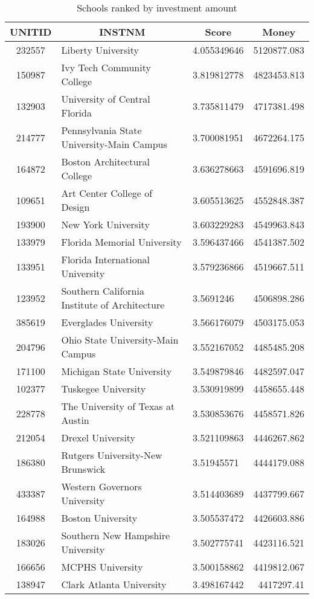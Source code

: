 \begin{table}[htbp]
  \centering
  \caption{Schools ranked by investment amount}
    \begin{tabular}{cllr}
    \toprule
    \textbf{UNITID} & \multicolumn{1}{c}{\textbf{INSTNM}} & \multicolumn{1}{c}{\textbf{Score}} & \multicolumn{1}{c}{\textbf{Money}} \\
    \midrule
    232557 & Liberty University & 4.055349646 & 5120877.083 \\
    150987 & Ivy Tech Community College & 3.819812778 & 4823453.813 \\
    132903 & University of Central Florida & 3.735811479 & 4717381.498 \\
    214777 & Pennsylvania State University-Main Campus & 3.700081951 & 4672264.175 \\
    164872 & Boston Architectural College & 3.636278663 & 4591696.819 \\
    109651 & Art Center College of Design & 3.605513625 & 4552848.387 \\
    193900 & New York University & 3.603229283 & 4549963.843 \\
    133979 & Florida Memorial University & 3.596437466 & 4541387.502 \\
    133951 & Florida International University & 3.579236866 & 4519667.511 \\
    123952 & Southern California Institute of Architecture & 3.5691246 & 4506898.286 \\
    385619 & Everglades University & 3.566176079 & 4503175.053 \\
    204796 & Ohio State University-Main Campus & 3.552167052 & 4485485.208 \\
    171100 & Michigan State University & 3.549879846 & 4482597.047 \\
    102377 & Tuskegee University & 3.530919899 & 4458655.448 \\
    228778 & The University of Texas at Austin & 3.530853676 & 4458571.826 \\
    212054 & Drexel University & 3.521109863 & 4446267.862 \\
    186380 & Rutgers University-New Brunswick & 3.51945571 & 4444179.088 \\
    433387 & Western Governors University & 3.514403689 & 4437799.667 \\
    164988 & Boston University & 3.505537472 & 4426603.886 \\
    183026 & Southern New Hampshire University & 3.502775741 & 4423116.521 \\
    166656 & MCPHS University & 3.500158862 & 4419812.067 \\
    138947 & Clark Atlanta University & 3.498167442 & 4417297.41 \\
    \bottomrule
    \end{tabular}%
  \label{tab:rank}%
\end{table}%


